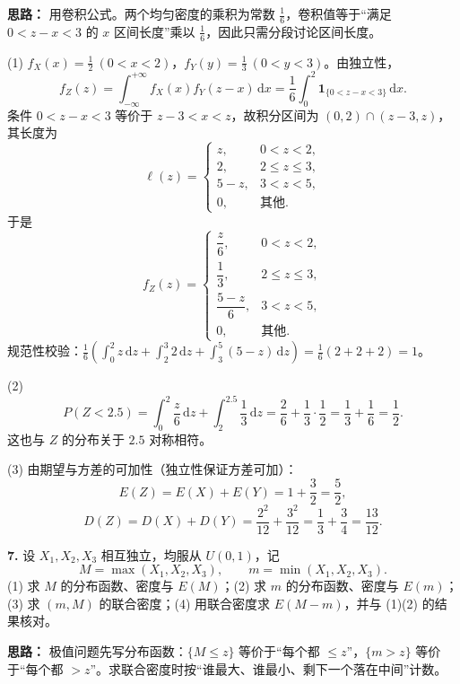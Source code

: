 \ifshowsolutions%
\textbf{思路：} 用卷积公式。两个均匀密度的乘积为常数 $\frac16$，卷积值等于“满足 $0<z-x<3$ 的 $x$ 区间长度”乘以 $\frac16$，因此只需分段讨论区间长度。

(1) $f_X(x)=\frac12\ (0<x<2)$，$f_Y(y)=\frac13\ (0<y<3)$。由独立性，
\[
f_Z(z)=\int_{-\infty}^{+\infty}f_X(x)f_Y(z-x)\,\mathrm dx
=\frac16\int_0^2 \mathbf 1_{\{0<z-x<3\}}\,\mathrm dx.
\]
条件 $0<z-x<3$ 等价于 $z-3<x<z$，故积分区间为 $(0,2)\cap(z-3,z)$，其长度为
\[
\ell(z)=\begin{cases}
z, & 0<z<2,\\
2, & 2\leq z\leq 3,\\
5-z, & 3<z<5,\\
0, & \text{其他}.
\end{cases}
\]
于是
\[
f_Z(z)=\begin{cases}
\dfrac{z}{6}, & 0<z<2,\\[4pt]
\dfrac13, & 2\leq z\leq 3,\\[4pt]
\dfrac{5-z}{6}, & 3<z<5,\\[4pt]
0, & \text{其他}.
\end{cases}
\]
规范性校验：$\frac16\left(\int_0^2 z\,\mathrm dz+\int_2^3 2\,\mathrm dz+\int_3^5(5-z)\,\mathrm dz\right)=\frac16(2+2+2)=1$。

(2)
\[
P(Z<2.5)=\int_0^2\frac{z}{6}\,\mathrm dz+\int_2^{2.5}\frac13\,\mathrm dz
=\frac{2}{6}+\frac{1}{3}\cdot\frac12
=\frac13+\frac16=\frac12.
\]
这也与 $Z$ 的分布关于 $2.5$ 对称相符。

(3) 由期望与方差的可加性（独立性保证方差可加）：
\[
E(Z)=E(X)+E(Y)=1+\frac32=\frac52,
\]
\[
D(Z)=D(X)+D(Y)=\frac{2^2}{12}+\frac{3^2}{12}
=\frac13+\frac34=\frac{13}{12}.
\]


\else \answerarea[10] \fi%
\textbf{7.} 设 $X_1,X_2,X_3$ 相互独立，均服从 $U(0,1)$，记
\[
M=\max(X_1,X_2,X_3),\qquad m=\min(X_1,X_2,X_3).
\]
(1) 求 $M$ 的分布函数、密度与 $E(M)$；(2) 求 $m$ 的分布函数、密度与 $E(m)$；(3) 求 $(m,M)$ 的联合密度；(4) 用联合密度求 $E(M-m)$，并与 (1)(2) 的结果核对。

\ifshowsolutions%
\textbf{思路：} 极值问题先写分布函数：$\{M\leq z\}$ 等价于“每个都 $\leq z$”，$\{m>z\}$ 等价于“每个都 $>z$”。求联合密度时按“谁最大、谁最小、剩下一个落在中间”计数。

